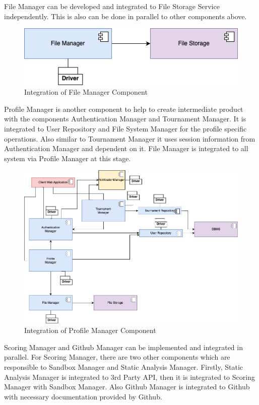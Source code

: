 \newpage
\indent File Manager can be developed and integrated to File Storage Service independently. This is also can be done in parallel to other components above. 

\begin{figure}[H]
    \centering
    \includegraphics[width=\linewidth]{Images/integration/integration_5.drawio.png}
    \caption{Integration of File Manager Component}
\end{figure}

\newpage
\indent Profile Manager is another component to help to create intermediate product with the components Authentication Manager and Tournament Manager. It is integrated to User Repository and File System Manager for the profile specific operations. Also similar to Tournament Manager it uses session information from Authentication Manager and dependent on it. File Manager is integrated to all system via Profile Manager at this stage.

\begin{figure}[H]
    \centering
    \includegraphics[width=\linewidth]{Images/integration/integration_6.drawio.png}
    \caption{Integration of Profile Manager Component}
\end{figure}

\newpage
\indent Scoring Manager and Github Manager can be implemented and integrated in parallel. For Scoring Manager, there are two other components which are responsible to Sandbox Manager and Static Analysis Manager. Firstly, Static Analysis Manager is integrated to 3rd Party API, then it is integrated to Scoring Manager with Sandbox Manager. Also Github Manager is integrated to Github with necessary documentation provided by Github.

